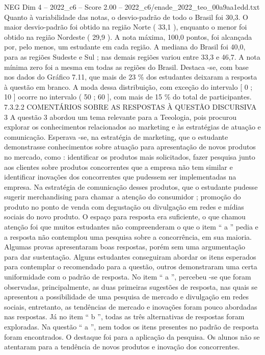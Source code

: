 \begin{textsample}{NEG Dim 4 – 2022\_c6 – Score 2.00 – 2022\_c6/enade\_2022\_teo\_00a9aa1edd.txt}
Quanto à variabilidade das notas, o desvio-padrão de todo o Brasil foi 30,3.
O maior desvio-padrão foi obtido na região Norte ( 33,1 ), enquanto o menor foi obtido na região Nordeste ( 29,9 ).
A nota máxima, 100,0 pontos, foi alcançada por, pelo menos, um estudante em cada região.
A mediana do Brasil foi 40,0, para as regiões Sudeste e Sul ; nas demais regiões variou entre 33,3 e 46,7.
A nota mínima zero foi a mesma em todas as regiões do Brasil.
Destaca -se, com base nos dados do Gráfico 7.11, que mais de 23 \% dos estudantes deixaram a resposta à questão em branco.
A moda dessa distribuição, com exceção do intervalo [ 0 ; 10 ] ocorre no intervalo ( 50 ; 60 ], com mais de 15 \% do total de participantes. 7.3.2.2 COMENTÁRIOS SOBRE AS RESPOSTAS À QUESTÃO DISCURSIVA 3 A questão 3 abordou um tema relevante para a Teeologia, pois procurou explorar os conhecimentos relacionados ao marketing e às estratégias de atuação e comunicação.
Esperava -se, na estratégia de marketing, que o estudante demonstrasse conhecimentos sobre atuação para apresentação de novos produtos no mercado, como : identificar os produtos mais solicitados, fazer pesquisa junto aos clientes sobre produtos concorrentes que a empresa não tem similar e identificar inovações dos concorrentes que pudessem ser implementadas na empresa.
Na estratégia de comunicação desses produtos, que o estudante pudesse sugerir merchandising para chamar a atenção do consumidor ; promoção do produto no ponto de venda com degustação ou divulgação em redes e mídias sociais do novo produto.
O espaço para resposta era suficiente, o que chamou atenção foi que muitos estudantes não compreenderam o que o item “ a ” pedia e a resposta não contemplou uma pesquisa sobre a concorrência, em sua maioria.
Algumas provas apresentaram boas respostas, porém sem uma argumentação para dar sustentação.
Alguns estudantes conseguiram abordar os itens esperados para contemplar o recomendado para a questão, outros demonstraram uma certa uniformidade com o padrão de resposta.
No item “ a ”, percebeu -se que foram observadas, principalmente, as duas primeiras sugestões de resposta, nas quais se apresentou a possibilidade de uma pesquisa de mercado e divulgação em redes sociais, entretanto, as tendências de mercado e inovações foram pouco abordadas nas respostas.
Já no item “ b ”, todas as três alternativas de respostas foram exploradas.
Na questão “ a ”, nem todos os itens presentes no padrão de resposta foram encontrados.
O destaque foi para a aplicação da pesquisa.
Os alunos não se atentaram para a tendência de novos produtos e inovação dos concorrentes.

\end{textsample}
